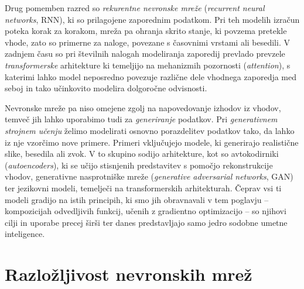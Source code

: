 Drug pomemben razred so \emph{rekurentne nevronske mreže} ({\em recurrent neural networks}, RNN),
%
%
ki so prilagojene zaporednim podatkom. Pri teh modelih izračun poteka korak za korakom, mreža pa ohranja skrito stanje, ki povzema pretekle vhode, zato so primerne za naloge, povezane s časovnimi vrstami ali besedili. V zadnjem času so pri številnih nalogah modeliranja zaporedij prevlado prevzele \emph{transformerske} arhitekture
%
%
ki temeljijo na mehanizmih pozornosti ({\em attention}), s katerimi lahko model neposredno povezuje različne dele vhodnega zaporedja med seboj in tako učinkovito modelira dolgoročne odvisnosti.

Nevronske mreže pa niso omejene zgolj na napovedovanje izhodov iz vhodov, temveč jih lahko uporabimo tudi za \emph{generiranje} podatkov. Pri \emph{generativnem strojnem učenju} želimo modelirati osnovno porazdelitev podatkov tako, da lahko iz nje vzorčimo nove primere. Primeri vključujejo modele, ki generirajo realistične slike, besedila ali zvok. V to skupino sodijo arhitekture, kot so avtokodirniki ({\em autoencoders}), ki se učijo stisnjenih predstavitev s pomočjo rekonstrukcije vhodov, generativne nasprotniške mreže ({\em generative adversarial networks}, GAN) ter jezikovni modeli, temelječi na transformerskih arhitekturah. Čeprav vsi ti modeli gradijo na istih principih, ki smo jih obravnavali v tem poglavju -- kompozicijah odvedljivih funkcij, učenih z gradientno optimizacijo -- so njihovi cilji in uporabe precej širši ter danes predstavljajo samo jedro sodobne umetne inteligence.

\section{Razložljivost nevronskih mrež}

